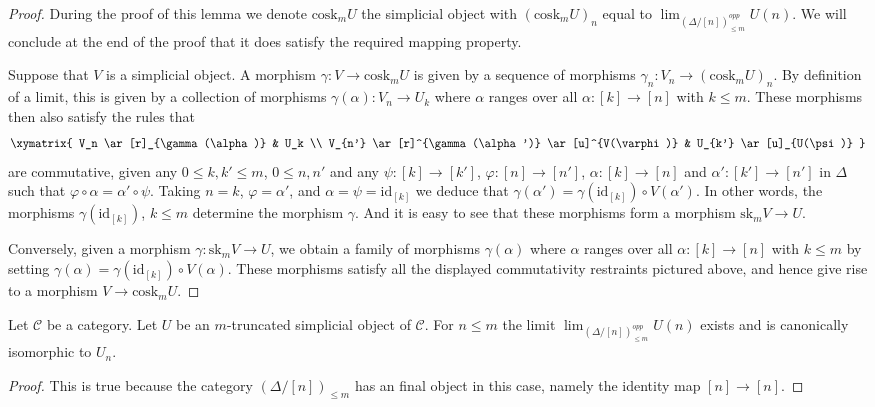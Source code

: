 \begin{proof}
During the proof of this lemma we denote $\text{cosk}_mU$ the
simplicial object with $(\text{cosk}_mU)_n$ equal to
$\lim_{(\Delta/[n])_{\leq m}^{opp}} U(n)$.
We will conclude at the end of the proof that it does
satisfy the required mapping property.

\medskip\noindent
Suppose that $V$ is a simplicial object.
A morphism $\gamma : V \to \text{cosk}_mU$ is given by a sequence
of morphisms $\gamma_n : V_n \to (\text{cosk}_mU)_n$.
By definition of a limit, this is given by a
collection of morphisms $\gamma(\alpha) : V_n \to U_k$
where $\alpha$ ranges over all $\alpha : [k] \to [n]$
with $k \leq m$. These morphisms then also satisfy
the rules that
$$
\xymatrix{
V_n \ar[r]_{\gamma(\alpha)} &  U_k \\
V_{n'} \ar[r]^{\gamma(\alpha')} \ar[u]^{V(\varphi)} & U_{k'} \ar[u]_{U(\psi)}
}
$$
are commutative, given any $0 \leq k, k' \leq m$, $0 \leq n, n'$
and any $\psi : [k] \to [k']$, $\varphi : [n] \to [n']$,
$\alpha : [k] \to [n]$ and $\alpha' : [k'] \to [n']$ in $\Delta$
such that $\varphi \circ \alpha = \alpha' \circ \psi$.
Taking $n = k$, $\varphi = \alpha'$, and $\alpha = \psi = \text{id}_{[k]}$
we deduce that $\gamma(\alpha') = \gamma(\text{id}_{[k]}) \circ V(\alpha')$.
In other words, the morphisms $\gamma(\text{id}_{[k]})$, $k \leq m$
determine the morphism $\gamma$. And it is easy to see that these
morphisms form a morphism $\text{sk}_m V \to U$.

\medskip\noindent
Conversely, given a morphism $\gamma : \text{sk}_m V \to U$,
we obtain a family of morphisms $\gamma(\alpha)$
where $\alpha$ ranges over all $\alpha : [k] \to [n]$
with $k \leq m$ by setting $\gamma(\alpha) =
\gamma(\text{id}_{[k]}) \circ V(\alpha)$. These morphisms
satisfy all the displayed commutativity restraints pictured
above, and hence give rise to a morphism $V \to \text{cosk}_m U$.
\end{proof}

\begin{lemma}
\label{lemma-trivial-cosk}
Let $\mathcal{C}$ be a category.
Let $U$ be an $m$-truncated simplicial object of $\mathcal{C}$.
For $n \leq m$ the limit $\lim_{(\Delta/[n])_{\leq m}^{opp}} U(n)$
exists and is canonically isomorphic to $U_n$.
\end{lemma}

\begin{proof}
This is true because the category $(\Delta/[n])_{\leq m}$
has an final object in this case, namely the identity
map $[n] \to [n]$.
\end{proof}


